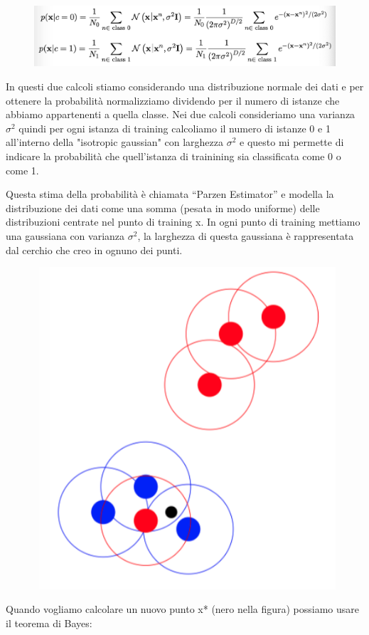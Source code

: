 \documentclass[14pt]{extreport}
\begin{document}
\begin{figure}[H]
	\centering
	\includegraphics[width=0.7\linewidth]{468.jpeg}
\end{figure}

In questi due calcoli stiamo considerando una distribuzione normale dei dati e per ottenere la probabilità normalizziamo dividendo per il numero di
istanze che abbiamo appartenenti a quella classe. Nei due calcoli consideriamo una varianza $\sigma^2$ quindi per ogni istanza di training calcoliamo
il numero di istanze 0 e 1 all’interno della "isotropic gaussian" con larghezza $\sigma^2$ e questo mi permette di indicare la probabilità che
quell’istanza di trainining sia classificata come 0 o come 1.

Questa stima della probabilità è chiamata “Parzen Estimator” e modella la distribuzione dei dati come una somma (pesata in modo uniforme) delle
distribuzioni centrate nel punto di training x. In ogni punto di training mettiamo una gaussiana con varianza $\sigma^2$, la larghezza di questa
gaussiana è rappresentata dal cerchio che creo in ognuno dei punti.



\begin{figure}[H]
	\centering
	\includegraphics[width=0.7\linewidth]{469.jpeg}
\end{figure}

Quando vogliamo calcolare un nuovo punto x* (nero nella figura) possiamo usare il teorema di Bayes:
\end{document}
